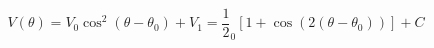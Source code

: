 \begin{equation}
\label{eq:Photodiode_Voltage}
V(\theta) = V_{0} \cos^2(\theta - {\theta}_0)+ V_{1} = \frac{1}{2}_0\left[1 + \cos(2 (\theta - \theta_0))\right]+ C
\end{equation}